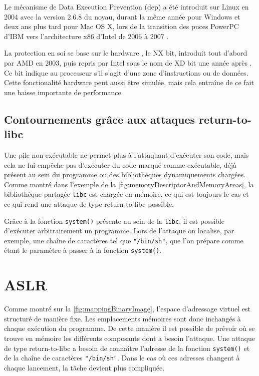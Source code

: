 Le mécanisme de Data Execution Prevention (\gls{dep}) a été introduit sur Linux en 2004 avec la version 2.6.8 du noyau, durant la même année pour Windows et deux ans plus tard pour Mac OS X, lors de la transition des puces PowerPC d'IBM vers l'architecture x86 d'Intel de 2006 à 2007 \cite{DataExecutionPrevention, PowerPC}.

La protection en soi se base sur le \og hardware \fg, le NX bit, introduit tout d'abord par AMD en 2003, puis repris par Intel sous le nom de \og XD bit \fg une année après \cite{ExecutableSpaceProtection, NXBit}. Ce bit indique au processeur s'il s'agit d'une zone d'instructions ou de données. Cette fonctionalité \og hardware \fg peut aussi être simulée, mais cela entraîne de ce fait une baisse importante de performance.

\subsection{Contournements grâce aux attaques \og return-to-libc \fg}

Une pile non-exécutable ne permet plus à l'attaquant d'exécuter son code, mais cela ne lui empêche pas d'exécuter du code marqué comme exécutable, déjà présent au sein du programme ou des bibliothèques dynamiquements chargées. Comme montré dans l'exemple de la \autoref{fig:memoryDescriptorAndMemoryAreas}, la bibliothèque partagée \texttt{libc} est chargée en mémoire, ce qui est toujours le cas et ce qui rend une attaque de type \og return-to-libc \fg \cite{ReturntolibcAttack} possible.

Grâce à la fonction \texttt{system()} présente au sein de la \texttt{libc}, il est possible d'exécuter arbitrairement un programme. Lors de l'attaque on localise, par exemple, une chaîne de caractères tel que \texttt{"/bin/sh"}, que l'on prépare comme étant le paramètre à passer à la fonction \texttt{system()}.

\section{ASLR}
\label{section:aslr}

Comme montré sur la \autoref{fig:mappingBinaryImage}, l'espace d'adressage virtuel est structuré de manière fixe. Les emplacements mémoires sont donc inchangés à chaque exécution du programme. De cette manière il est possible de prévoir où se trouve en mémoire les différents composants dont a besoin l'attaque. Une attaque de type \og return-to-libc \fg a besoin de connaître l'adresse de la fonction \texttt{system()} et de la chaîne de caractères \texttt{"/bin/sh"}. Dans le cas où ces adresses changent à chaque lancement, la tâche devient plus compliquée.

